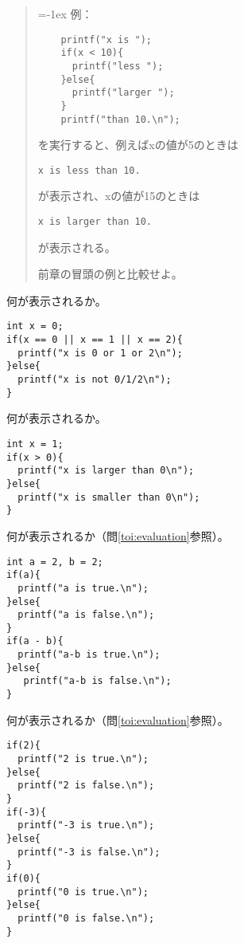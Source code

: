 \documentclass[12pt,a4j]{jarticle}
\newcounter{toi}
\def\toi{%
\bigskip\bigskip\noindent
\addtocounter{toi}{1}
\shadowbox{\bfseries\large 問\thetoi}
\nopagebreak[4]\bigskip\nopagebreak[4]
}
\begin{document}
\begin{quote}\topsep=-1ex
例：
\begin{verbatim}
    printf("x is ");
    if(x < 10){
      printf("less ");
    }else{
      printf("larger ");
    }
    printf("than 10.\n");
\end{verbatim}
を実行すると、例えば{\ttfamily x}の値が5のときは
\begin{verbatim}
x is less than 10.
\end{verbatim}
が表示され、{\ttfamily x}の値が15のときは
\begin{verbatim}
x is larger than 10.
\end{verbatim}
が表示される。

前章の冒頭の例と比較せよ。
\end{quote}






\toi

何が表示されるか。
\begin{verbatim}
int x = 0;
if(x == 0 || x == 1 || x == 2){
  printf("x is 0 or 1 or 2\n");
}else{
  printf("x is not 0/1/2\n");
}
\end{verbatim}




\toi

何が表示されるか。
\begin{verbatim}
int x = 1;
if(x > 0){
  printf("x is larger than 0\n");
}else{
  printf("x is smaller than 0\n");
}
\end{verbatim}



\toi

何が表示されるか（問\ref{toi:evaluation}参照）。

\begin{verbatim}
int a = 2, b = 2;
if(a){
  printf("a is true.\n");
}else{
  printf("a is false.\n");
}
if(a - b){
  printf("a-b is true.\n");
}else{
   printf("a-b is false.\n");
}
\end{verbatim}












\toi

何が表示されるか（問\ref{toi:evaluation}参照）。
\begin{verbatim}
if(2){
  printf("2 is true.\n");
}else{
  printf("2 is false.\n");
}
if(-3){
  printf("-3 is true.\n");
}else{
  printf("-3 is false.\n");
}
if(0){
  printf("0 is true.\n");
}else{
  printf("0 is false.\n");
}
\end{verbatim}
\end{document}

